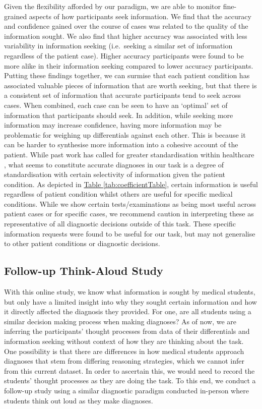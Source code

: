 \documentclass[a4paper, nobind]{templates/ociamthesis}
\begin{document}
Given the flexibility afforded by our paradigm, we are able to monitor fine-grained aspects of how participants seek information. We find that the accuracy and confidence gained over the course of cases was related to the quality of the information sought. We also find that higher accuracy was associated with less variability in information seeking (i.e.~seeking a similar set of information regardless of the patient case). Higher accuracy participants were found to be more alike in their information seeking compared to lower accuracy participants. Putting these findings together, we can surmise that each patient condition has associated valuable pieces of information that are worth seeking, but that there is a consistent set of information that accurate participants tend to seek across cases. When combined, each case can be seen to have an `optimal' set of information that participants should seek. In addition, while seeking more information may increase confidence, having more information may be problematic for weighing up differentials against each other. This is because it can be harder to synthesise more information into a cohesive account of the patient. While past work has called for greater standardisation within healthcare \autocite{wears_standardisation_2015}, what seems to constitute accurate diagnoses in our task is a degree of standardisation with certain selectivity of information given the patient condition. As depicted in \hyperref[tab:coefficientTable]{Table \ref{tab:coefficientTable}}, certain information is useful regardless of patient condition whilst others are useful for specific medical conditions. While we show certain tests/examinations as being most useful across patient cases or for specific cases, we recommend caution in interpreting these as representative of all diagnostic decisions outside of this task. These specific information requests were found to be useful for our task, but may not generalise to other patient conditions or diagnostic decisions.

\subsection{Follow-up Think-Aloud Study}\label{follow-up-think-aloud-study}

With this online study, we know what information is sought by medical students, but only have a limited insight into why they sought certain information and how it directly affected the diagnosis they provided. For one, are all students using a similar decision making process when making diagnoses? As of now, we are inferring the participants' thought processes from data of their differentials and information seeking without context of how they are thinking about the task. One possibility is that there are differences in how medical students approach diagnoses that stem from differing reasoning strategies, which we cannot infer from this current dataset. In order to ascertain this, we would need to record the students' thought processes as they are doing the task. To this end, we conduct a follow-up study using a similar diagnostic paradigm conducted in-person where students think out loud as they make diagnoses.
\end{document}
